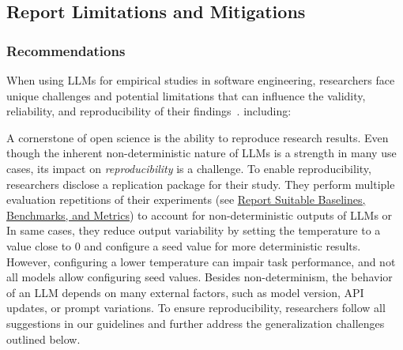 



\subsection{Report Limitations and Mitigations}

\subsubsection{Recommendations}

When using LLMs for empirical studies in software engineering, researchers face unique challenges and potential limitations that can influence the validity, reliability, and reproducibility of their findings~\cite{sallou2024breaking}.
 including:

A cornerstone of open science is the ability to reproduce research results.
Even though the inherent non-deterministic nature of LLMs is a strength in many use cases, its impact on \emph{reproducibility} is a challenge. To enable reproducibility, researchers \must disclose a replication package for their study.
 They \should perform multiple evaluation repetitions of their experiments (see \href{/guidelines/report-baselines-benchmarks-and-metrics}{Report Suitable Baselines, Benchmarks, and Metrics}) to account for non-deterministic outputs of LLMs or
In same cases, they \may reduce output variability by setting the temperature to a value close to 0 and configure a seed value for more deterministic results.
However, configuring a lower temperature can impair task performance, and not all models allow configuring seed values.
Besides non-determinism, the behavior of an LLM depends on many external factors, such as model version, API updates, or prompt variations.
To ensure reproducibility, researchers \should follow all suggestions in our guidelines and further address the generalization challenges outlined below.

